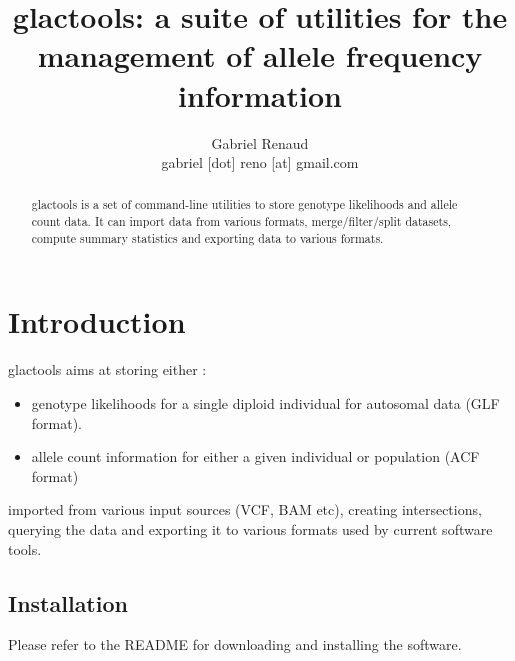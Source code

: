 \documentclass[a4paper]{article}
\title{glactools: a suite of utilities for the management of allele frequency information}
\author{Gabriel Renaud \\
gabriel [dot] reno [at]  gmail.com}
\date{}
\begin{document}
\maketitle

\begin{abstract}
glactools is a set of command-line utilities to store genotype likelihoods and allele count data. It can import data from various formats, merge/filter/split datasets, compute summary statistics and exporting data to various formats.
\end{abstract}

\tableofcontents


\section{Introduction}

glactools aims at storing either :
\begin{itemize}
\item genotype likelihoods for a single diploid individual for autosomal data (GLF format).
\item allele count information for either a given individual or population (ACF format)
\end{itemize}
imported from various input sources (VCF, BAM etc), creating intersections, querying the data and exporting it to various formats used by current software tools.

\subsection{Installation}

Please refer to the README for downloading and installing the software.
\end{document}
